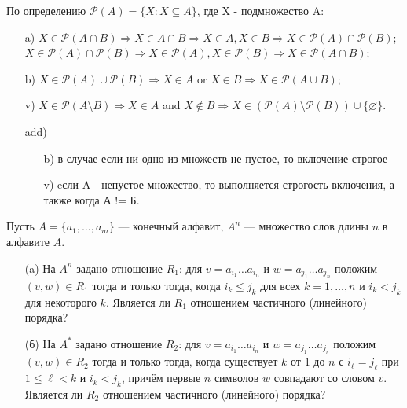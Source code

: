 \documentclass{article}
\begin{document}
\begin{solution}[2]
По определению $\mathcal{P}(A) = \lbrace X : X \subseteq A \rbrace $, где X - подмножество A:
\begin{enumerate}
	\item[a)] $X \in \mathcal{P}(A \cap B) \Rightarrow X \in A \cap B \Rightarrow X \in A, X \in B \Rightarrow X \in \mathcal{P}(A) \cap \mathcal{P}(B)$;
	$X \in \mathcal{P}(A) \cap \mathcal{P}(B) \Rightarrow X \in \mathcal{P}(A), X \in \mathcal{P}(B) \Rightarrow X \in \mathcal{P}(A \cap B)$;
	\item[b)] $X \in \mathcal{P}(A) \cup \mathcal{P}(B) \Rightarrow X \in A$ or $X \in B \Rightarrow X \in \mathcal{P}(A \cup B)$;
	\item[v)] $X \in \mathcal{P}(A \setminus B) \Rightarrow X \in A $ and $ X \notin B \Rightarrow X \in (\mathcal{P}(A) \setminus \mathcal{P}(B)) \cup \lbrace \varnothing \rbrace$.
	\item[add)]
	\begin{enumerate}
	\item[b)]в случае если ни одно из множеств не пустое, то включение строгое
	\item[v)]eсли A - непустое множество, то выполняется строгость включения, а также когда А != Б.
	\end{enumerate}
\end{enumerate}
\end{solution}

\begin{task}[3]
Пусть $A = \{a_1, \ldots, a_m\}$ — конечный алфавит, $A^n$ — множество слов длины $n$ в алфавите $A$.
\begin{enumerate}
    \item[(a)] На $A^n$ задано отношение $R_1$: для $v = a_{i_1}\ldots a_{i_n}$ и $w = a_{j_1}\ldots a_{j_n}$ положим $(v,w)\in R_1$ тогда и только тогда, когда $i_k\le j_k$ для всех $k=1,\dots,n$ и $i_k<j_k$ для некоторого $k$. Является ли $R_1$ отношением частичного (линейного) порядка?
    \item[(б)] На $A^*$ задано отношение $R_2$: для $v = a_{i_1}\ldots a_{i_n}$ и $w = a_{j_1}\ldots a_{j_r}$ положим $(v,w)\in R_2$ тогда и только тогда, когда существует $k$ от $1$ до $n$ с $i_\ell=j_\ell$ при $1\le \ell<k$ и $i_k<j_k$, причём первые $n$ символов $w$ совпадают со словом $v$. Является ли $R_2$ отношением частичного (линейного) порядка?
\end{enumerate}
\end{task}
\end{document}
